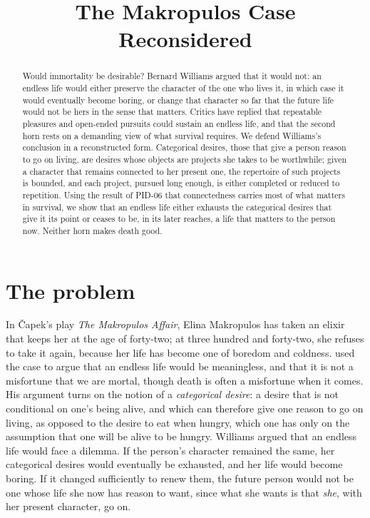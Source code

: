 \documentclass{situationist-preprint}
\title{The Makropulos Case Reconsidered}
\begin{document}
\maketitle

\begin{abstract}
Would immortality be desirable? Bernard Williams argued that it would not: an endless life would either preserve the character of the one who lives it, in which case it would eventually become boring, or change that character so far that the future life would not be hers in the sense that matters. Critics have replied that repeatable pleasures and open-ended pursuits could sustain an endless life, and that the second horn rests on a demanding view of what survival requires. We defend Williams's conclusion in a reconstructed form. Categorical desires, those that give a person reason to go on living, are desires whose objects are projects she takes to be worthwhile; given a character that remains connected to her present one, the repertoire of such projects is bounded, and each project, pursued long enough, is either completed or reduced to repetition. Using the result of PID-06 that connectedness carries most of what matters in survival, we show that an endless life either exhausts the categorical desires that give it its point or ceases to be, in its later reaches, a life that matters to the person now. Neither horn makes death good.
\end{abstract}

\section{The problem}

In \v{C}apek's play \emph{The Makropulos Affair}, Elina Makropulos has taken an elixir that keeps her at the age of forty-two; at three hundred and forty-two, she refuses to take it again, because her life has become one of boredom and coldness. \citet{Williams1973} used the case to argue that an endless life would be meaningless, and that it is not a misfortune that we are mortal, though death is often a misfortune when it comes. His argument turns on the notion of a \emph{categorical desire}: a desire that is not conditional on one's being alive, and which can therefore give one reason to go on living, as opposed to the desire to eat when hungry, which one has only on the assumption that one will be alive to be hungry. Williams argued that an endless life would face a dilemma. If the person's character remained the same, her categorical desires would eventually be exhausted, and her life would become boring. If it changed sufficiently to renew them, the future person would not be one whose life she now has reason to want, since what she wants is that \emph{she}, with her present character, go on.
\end{document}
